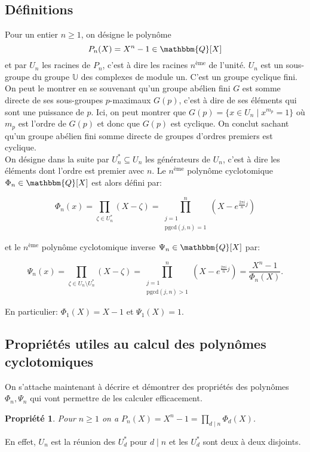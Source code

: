\documentclass{article}
\newcommand{\Q}{\mathbbm{Q}}
\newcommand{\pgcd}{\mathrm{pgcd}}
\theoremstyle{break}                  %
\newtheorem{propriete}{Propriété}
\begin{document}
\subsection*{Définitions}
Pour un entier $n \ge 1$, on désigne le polynôme $$P_n(X) = X^n - 1 \in \Q[X]$$ et par $U_n$ les racines de $P_n$, c'est à dire les racines $n^{\text{ème}}$ de l'unité. $U_n$ est un sous-groupe du groupe $\mathbb U$ des complexes de module un. C'est un groupe cyclique fini. On peut le montrer en se souvenant qu'un groupe abélien fini $G$ est somme directe de ses sous-groupes $p$-maximaux $G(p)$, c'est à dire de ses éléments qui sont une puissance de $p$. Ici, on peut montrer que $G(p) = \{x \in U_n \mid x^{m_p} = 1\}$ où $m_p$ est l'ordre de $G(p)$ et donc que $G(p)$ est cyclique. On conclut sachant qu'un groupe abélien fini somme directe de groupes d'ordres premiers est cyclique.\\


On désigne dans la suite par $U_n^* \subseteq U_n$ les générateurs de $U_n$, c'est à dire les éléments dont l'ordre est premier avec $n$. Le $n^{\text{ème}}$ polynôme cyclotomique $\Phi_n \in \Q[X]$ est alors défini par:

$$\Phi_n(x) = \prod_{\zeta \in U^*_n} (X - \zeta) = \prod_{\substack{j=1\\ \pgcd(j,n)=1}}^n (X - e^{\frac{2 \pi i}{n}j})$$

et le $n^{\text{ème}}$ polynôme cyclotomique inverse $\Psi_n \in \Q[X]$ par:

$$\Psi_n(x) = \prod_{\zeta \in U_n \setminus U^*_n} (X - \zeta) = \prod_{\substack{j=1\\ \pgcd(j,n) > 1}}^n (X - e^{\frac{2 \pi i}{n}j}) = \frac{X^n - 1}{\Phi_n(X)}.$$

En particulier: $\Phi_1(X) = X-1$ et $\Psi_1(X) = 1$.

\subsection*{Propriétés utiles au calcul des polynômes cyclotomiques}
On s'attache maintenant à décrire et démontrer des propriétés des polynômes $\Phi_n, \Psi_n$ qui vont permettre de les calculer efficacement. 

\begin{propriete}
	Pour $n \ge 1$ on a $P_n(X) = X^n-1 = \prod_{ d \mid n} \Phi_d(X)$.
\end{propriete}
En effet, $U_n$ est la réunion des $U_d^*$ pour $d \mid n$ et les $U_d^*$ sont deux à deux disjoints.
\end{document}
